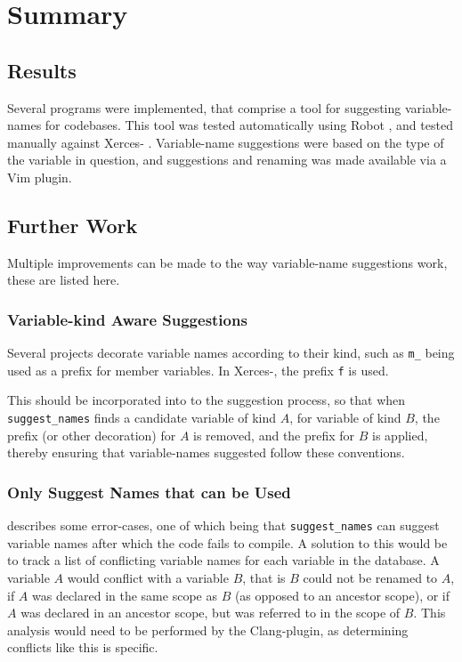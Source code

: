 \chapter{Summary}
\label{chap:Summary}

\section{Results}
Several programs were implemented, that comprise a tool for suggesting
variable-names for \CC{} codebases. This tool was tested automatically using
Robot \cite{robotframework}, and tested manually against Xerces-\CC{}
\cite{xerces-c}. Variable-name suggestions were based on the type of the
variable in question, and suggestions and renaming was made available via a Vim
plugin.

\section{Further Work}
Multiple improvements can be made to the way variable-name suggestions work,
these are listed here.

\subsection{Variable-kind Aware Suggestions}
Several projects decorate variable names according to their kind, such as
\lstinline|m_| being used as a prefix for member variables. In Xerces-\CC{}, the
prefix  \lstinline|f| is used.

This should be incorporated into to the suggestion process, so that when
\lstinline|suggest_names| finds a candidate variable of kind $A$, for variable
of kind $B$, the prefix (or other decoration) for $A$ is removed, and the prefix
for $B$ is applied, thereby ensuring that variable-names suggested follow these
conventions.

\subsection{Only Suggest Names that can be Used}
\label{subsec:onlysuggestworkingnames}
 describes some error-cases, one of which being that
\lstinline|suggest_names| can suggest variable names after which the code fails
to compile. A solution to this would be to track a list of conflicting variable
names for each variable in the database. A variable $A$ would conflict with a
variable $B$, that is $B$ could not be renamed to $A$, if $A$ was declared in
the same scope as $B$ (as opposed to an ancestor scope), or if $A$ was declared
in an ancestor scope, but was referred to in the scope of $B$. This analysis
would need to be performed by the Clang-plugin, as determining conflicts like
this is \CC{} specific.

